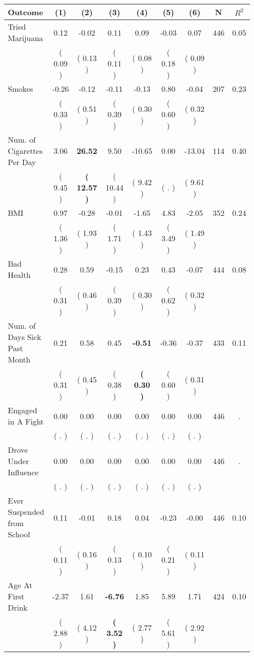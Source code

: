 \begin{tabular}{lcccccccc}
\toprule
 \textbf{Outcome} & \textbf{(1)} & \textbf{(2)} & \textbf{(3)} & \textbf{(4)} & \textbf{(5)} & \textbf{(6)} & \textbf{N} & \textbf{$ R^2$} \\
\midrule
Tried Marijuana &      0.12 &     -0.02 &      0.11 &      0.09 &     -0.03 &      0.07 & 446 &       0.05 \\ 
 & (     0.09 ) & (     0.13 ) & (     0.11 ) & (     0.08 ) & (     0.18 ) & (     0.09 ) & \\
Smokes &     -0.26 &     -0.12 &     -0.11 &     -0.13 &      0.80 &     -0.04 & 207 &       0.23 \\ 
 & (     0.33 ) & (     0.51 ) & (     0.39 ) & (     0.30 ) & (     0.60 ) & (     0.32 ) & \\
Num. of Cigarettes Per Day &      3.06 & \textbf{    26.52} &      9.50 &    -10.65 &      0.00 &    -13.04 & 114 &       0.40 \\ 
 & (     9.45 ) & \textbf{(    12.57 )} & (    10.44 ) & (     9.42 ) & (        . ) & (     9.61 ) & \\
BMI &      0.97 &     -0.28 &     -0.01 &     -1.65 &      4.83 &     -2.05 & 352 &       0.24 \\ 
 & (     1.36 ) & (     1.93 ) & (     1.71 ) & (     1.43 ) & (     3.49 ) & (     1.49 ) & \\
Bad Health &      0.28 &      0.59 &     -0.15 &      0.23 &      0.43 &     -0.07 & 444 &       0.08 \\ 
 & (     0.31 ) & (     0.46 ) & (     0.39 ) & (     0.30 ) & (     0.62 ) & (     0.32 ) & \\
Num. of Days Sick Past Month &      0.21 &      0.58 &      0.45 & \textbf{    -0.51} &     -0.36 &     -0.37 & 433 &       0.11 \\ 
 & (     0.31 ) & (     0.45 ) & (     0.38 ) & \textbf{(     0.30 )} & (     0.60 ) & (     0.31 ) & \\
Engaged in A Fight &      0.00 &      0.00 &      0.00 &      0.00 &      0.00 &      0.00 & 446 &          . \\ 
 & (        . ) & (        . ) & (        . ) & (        . ) & (        . ) & (        . ) & \\
Drove Under Influence &      0.00 &      0.00 &      0.00 &      0.00 &      0.00 &      0.00 & 446 &          . \\ 
 & (        . ) & (        . ) & (        . ) & (        . ) & (        . ) & (        . ) & \\
Ever Suspended from School &      0.11 &     -0.01 &      0.18 &      0.04 &     -0.23 &     -0.00 & 446 &       0.10 \\ 
 & (     0.11 ) & (     0.16 ) & (     0.13 ) & (     0.10 ) & (     0.21 ) & (     0.11 ) & \\
Age At First Drink &     -2.37 &      1.61 & \textbf{    -6.76} &      1.85 &      5.89 &      1.71 & 424 &       0.10 \\ 
 & (     2.88 ) & (     4.12 ) & \textbf{(     3.52 )} & (     2.77 ) & (     5.61 ) & (     2.92 ) & \\
\bottomrule
\end{tabular}
